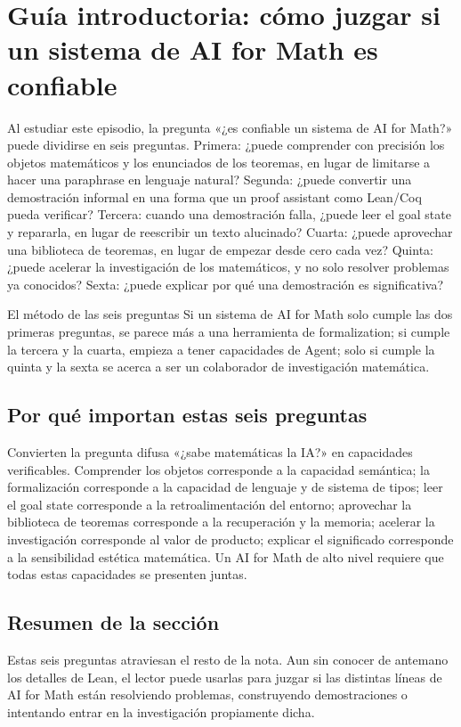 \section{Guía introductoria: cómo juzgar si un sistema de AI for Math es confiable}

Al estudiar este episodio, la pregunta «¿es confiable un sistema de AI for Math?» puede dividirse en seis preguntas. Primera: ¿puede comprender con precisión los objetos matemáticos y los enunciados de los teoremas, en lugar de limitarse a hacer una paraphrase en lenguaje natural? Segunda: ¿puede convertir una demostración informal en una forma que un proof assistant como Lean/Coq pueda verificar? Tercera: cuando una demostración falla, ¿puede leer el goal state y repararla, en lugar de reescribir un texto alucinado? Cuarta: ¿puede aprovechar una biblioteca de teoremas, en lugar de empezar desde cero cada vez? Quinta: ¿puede acelerar la investigación de los matemáticos, y no solo resolver problemas ya conocidos? Sexta: ¿puede explicar por qué una demostración es significativa?

\begin{importantbox}{El método de las seis preguntas}
Si un sistema de AI for Math solo cumple las dos primeras preguntas, se parece más a una herramienta de formalization; si cumple la tercera y la cuarta, empieza a tener capacidades de Agent; solo si cumple la quinta y la sexta se acerca a ser un colaborador de investigación matemática.
\end{importantbox}

\subsection{Por qué importan estas seis preguntas}

Convierten la pregunta difusa «¿sabe matemáticas la IA?» en capacidades verificables. Comprender los objetos corresponde a la capacidad semántica; la formalización corresponde a la capacidad de lenguaje y de sistema de tipos; leer el goal state corresponde a la retroalimentación del entorno; aprovechar la biblioteca de teoremas corresponde a la recuperación y la memoria; acelerar la investigación corresponde al valor de producto; explicar el significado corresponde a la sensibilidad estética matemática. Un AI for Math de alto nivel requiere que todas estas capacidades se presenten juntas.

\subsection{Resumen de la sección}

Estas seis preguntas atraviesan el resto de la nota. Aun sin conocer de antemano los detalles de Lean, el lector puede usarlas para juzgar si las distintas líneas de AI for Math están resolviendo problemas, construyendo demostraciones o intentando entrar en la investigación propiamente dicha.
